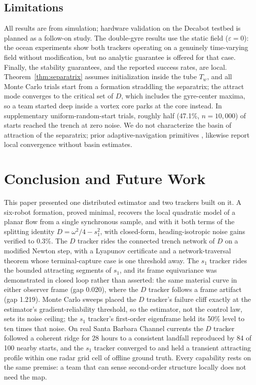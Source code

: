 \documentclass[lettersize,journal]{IEEEtran}
\begin{document}
\subsection{Limitations}
\label{sec:limitations}

All results are from simulation; hardware validation on the Decabot
testbed is planned as a follow-on study. The double-gyre results use
the static field ($\varepsilon = 0$): the ocean experiments show both
trackers operating on a genuinely time-varying field without
modification, but no analytic guarantee is offered for that case.
Finally, the stability guarantees, and the reported success rates, are
local. Theorem~\ref{thm:separatrix} assumes initialization inside the
tube $T_w$, and all Monte Carlo trials start from a formation
straddling the separatrix; the attract mode converges to the critical
set of $D$, which includes the gyre-center maxima, so a team started
deep inside a vortex core parks at the core instead. In supplementary
uniform-random-start trials, roughly half (47.1\%, $n = 10{,}000$) of
starts reached the trench at zero noise. We do not characterize the
basin of attraction of the separatrix; prior adaptive-navigation
primitives \cite{27}, \cite{28} likewise report local convergence
without basin estimates.


\section{Conclusion and Future Work}
\label{sec:conclusion}
\label{sec:future}

This paper presented one distributed estimator and two trackers built
on it. A six-robot formation, proved minimal, recovers the local
quadratic model of a planar flow from a single synchronous sample, and
with it both terms of the splitting identity $D = \omega^2/4 - s_1^2$,
with closed-form, heading-isotropic noise gains verified to $0.3\%$.
The $D$ tracker rides the connected trench network of $D$ on a modified
Newton step, with a Lyapunov certificate and a network-traversal
theorem whose terminal-capture case is one threshold away. The $s_1$
tracker rides the bounded attracting segments of $s_1$, and its frame
equivariance was demonstrated in closed loop rather than asserted: the
same material curve in either observer frame (gap 0.020), where the $D$
tracker follows a frame artifact (gap 1.219). Monte Carlo sweeps placed
the $D$ tracker's failure cliff exactly at the estimator's
gradient-reliability threshold, so the estimator, not the control law,
sets its noise ceiling; the $s_1$ tracker's first-order eigenframe held
its 50\% level to ten times that noise. On real Santa Barbara Channel
currents the $D$ tracker followed a coherent ridge for 28 hours to a
consistent landfall reproduced by 84 of 100 nearby starts, and the
$s_1$ tracker converged to and held a transient attracting profile
within one radar grid cell of offline ground truth. Every capability
rests on the same premise: a team that can sense second-order structure
locally does not need the map.
\end{document}
